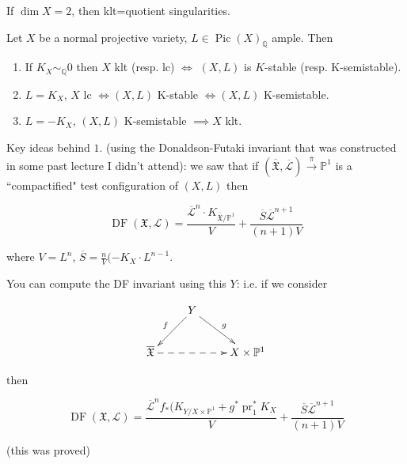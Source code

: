 \begin{remark}
\label{remark-montero-4}
If $\dim X=2$, then klt=quotient
singularities.
\end{remark}

\begin{theorem}[Odaka '12, '13]
\label{theorem-montero-2}
Let $X$ be a normal projective variety, $L
\in \operatorname{Pic}(X)_\mathbb{Q}$ ample.
Then
\begin{enumerate}
\item  If $K_X \sim_\mathbb{Q} 0$ then $X$
klt (resp. lc) $\iff$ $(X,L)$ is $K$-stable
(resp. K-semistable).
\item $L=K_X$, $X$ lc $\iff (X,L)$ K-stable
$\iff (X,L)$ K-semistable.
\item $L=-K_X$, $(X,L)$ K-semistable
$\implies  X$ klt.
\end{enumerate}
\end{theorem}

Key ideas behind $1.$ (using the
Donaldson-Futaki invariant that was
constructed in some past lecture I didn't
attend): we saw that if
$(\overline{\mathfrak{X}},\overline{
\mathcal{L}})
\xrightarrow{\overline{\pi}} \mathbb{P}^1$ is
a ``compactified" test configuration of
$(X,L)$ then

$$
\operatorname{DF}(\mathfrak{X},\mathcal{L}) =
\frac{\overline{\mathcal{L}}^n\cdot
K_{\overline{\mathfrak{X}}/\mathbb{P}^1}}{V}+
\frac{\overline{S}\overline{\mathcal{L}}^{n+
1}}{(n+1)V}
$$

where $V=L^n$,
$\overline{S}=\frac{n}{V}(-K_X\cdot L^{n-1}$.

\begin{remark}
\label{remark-montero-5}
You can compute the DF invariant using this
$Y$: i.e. if we consider

$$
\xymatrix{&Y\ar[dl]_{f}\ar[dr]^{g}&\\
\overline{\mathfrak{X}}\ar@{-->}[rr]&&X\times
\mathbb{P}^1}
$$

then

$$
\operatorname{DF}(\mathfrak{X},\mathcal{L})=
\frac{\overline{\mathcal{L}}^nf_*(K_{Y/X
\times \mathbb{P}^1}+g^*
\operatorname{pr}_1^*K_X}{V}+\frac{
\overline{S}\overline{\mathcal{L}}^{n+1}}{(n+
1)V}
$$

(this was proved)
\end{remark}

